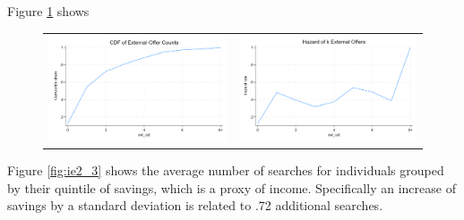 \documentclass[12pt]{article}
\begin{document}
Figure \ref{fig:ie2_2} shows 


\begin{figure}[H]
\caption{}
 \label{fig:ie2_2}
\centering{}%
\begin{tabular}{cc}
\includegraphics[scale=0.27]{figures/IE2_CDF_number_extoffers.png} &\includegraphics[scale=0.27]{figures/IE2_hazard_number_extoffers.png}
\end{tabular}
\end{figure}



Figure \ref{fig:ie2_3} shows the average number of searches for individuals grouped by their quintile of savings, which is a proxy of income. Specifically an increase of savings by a standard deviation is related to .72 additional searches. 
\end{document}

